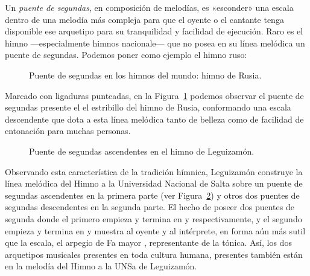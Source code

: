 \label{par:puente}Un \emph{puente de segundas}, en composición de melodías, es «esconder» una escala dentro de una melodía más compleja para que el oyente o el cantante tenga disponible ese arquetipo para su tranquilidad y facilidad de ejecución. Raro es el himno ---especialmente himnos nacionale--- que no posea en su línea melódica un puente de segundas. Podemos poner como ejemplo el himno ruso:

\begin{figure}[H]
\caption{Puente de segundas en los himnos del mundo: himno de Rusia.}
\label{fig:himno-ruso}
\end{figure}

Marcado con ligaduras punteadas, en la Figura~\ref{fig:himno-ruso} podemos observar el puente de segundas presente el el estribillo del himno de Rusia, conformando una escala descendente  que dota a esta línea melódica tanto de belleza como de facilidad de entonación para muchas personas.

\begin{figure}[H]
\caption{Puente de segundas ascendentes en el himno de Leguizamón.}
\label{fig:segundas-ascendentes-himno}
\end{figure}

Observando esta característica de la tradición hímnica, Leguizamón construye la línea melódica del Himno a la Universidad Nacional de Salta sobre un puente de segundas ascendentes  en la primera parte (ver Figura~\ref{fig:segundas-ascendentes-himno}) y otros dos puentes de segundas descendentes  en la segunda parte. El hecho de poseer dos puentes de segunda donde el primero empieza y termina en  y  respectivamente, y el segundo empieza y termina en  y  muestra al oyente y al intérprete, en forma aún más sutil que la escala, el arpegio de Fa mayor \hbox{,} representante de la tónica. Así, los dos arquetipos musicales presentes en toda cultura humana, presentes también están en la melodía del Himno a la UNSa de Leguizamón.

